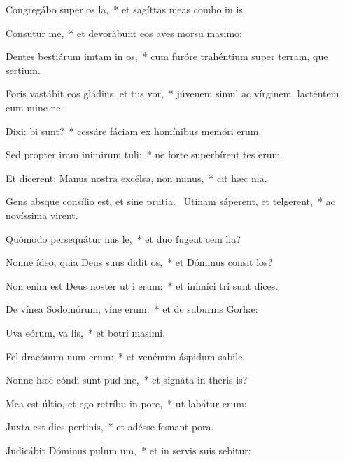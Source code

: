\item Congregábo super os la,~* et sagíttas meas combo in is.
\item Consutur me,~* et devorábunt eos aves morsu masimo:
\item Dentes bestiárum imtam in os,~* cum furóre trahéntium super terram, que sertium.
\item Foris vastábit eos gládius, et tus vor,~* júvenem simul ac vírginem, lacténtem cum mine ne.
\item Dixi: bi sunt?~* cessáre fáciam ex homínibus memóri erum.
\item Sed propter iram inimirum tuli:~* ne forte superbírent tes erum.
\item Et dícerent: Manus nostra excélsa,  non minus,~* cit hæc nia.
\item Gens absque consílio est, et sine prutia.~\pscross{} Utinam sáperent, et telgerent,~* ac novíssima virent.
\item Quómodo persequátur nus le,~* et duo fugent cem lia?
\item Nonne ídeo, quia Deus suus didit os,~* et Dóminus consit los?
\item Non enim est Deus noster ut i erum:~* et inimíci tri sunt dices.
\item De vínea Sodomórum, víne erum:~* et de suburnis Gorhæ:
\item Uva eórum, va lis,~* et botri masimi.
\item Fel dracónum num erum:~* et venénum áspidum sabile.
\item Nonne hæc cóndi sunt pud me,~* et signáta in theris is?
\item Mea est últio, et ego retríbu in pore,~* ut labátur  erum:
\item Juxta est dies pertinis,~* et adésse fesnant pora.
\item Judicábit Dóminus pulum um,~* et in servis suis sebitur:
